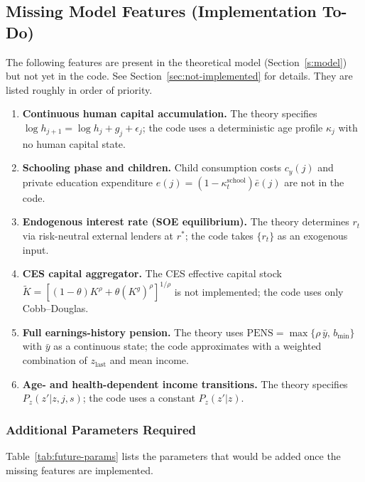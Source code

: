 \subsection{Missing Model Features (Implementation To-Do)}

The following features are present in the theoretical model (Section~\ref{s:model}) but not yet in the code. See Section~\ref{sec:not-implemented} for details. They are listed roughly in order of priority.

\begin{enumerate}
    \item \textbf{Continuous human capital accumulation.} The theory specifies $\log h_{j+1} = \log h_j + g_j + \epsilon_j$; the code uses a deterministic age profile $\kappa_j$ with no human capital state.
    \item \textbf{Schooling phase and children.} Child consumption costs $c_y(j)$ and private education expenditure $e(j) = (1-\kappa^{\text{school}}_t)\bar{e}(j)$ are not in the code.
    \item \textbf{Endogenous interest rate (SOE equilibrium).} The theory determines $r_t$ via risk-neutral external lenders at $r^*$; the code takes $\{r_t\}$ as an exogenous input.
    \item \textbf{CES capital aggregator.} The CES effective capital stock $\tilde{K} = [(1-\theta)K^\rho + \theta(K^g)^\rho]^{1/\rho}$ is not implemented; the code uses only Cobb--Douglas.
    \item \textbf{Full earnings-history pension.} The theory uses $\text{PENS} = \max\{\rho\,\bar{y},\,b_{\min}\}$ with $\bar{y}$ as a continuous state; the code approximates with a weighted combination of $z_{\text{last}}$ and mean income.
    \item \textbf{Age- and health-dependent income transitions.} The theory specifies $P_z(z'|z,j,s)$; the code uses a constant $P_z(z'|z)$.
\end{enumerate}

\subsubsection{Additional Parameters Required}

Table~\ref{tab:future-params} lists the parameters that would be added once the missing features are implemented.

